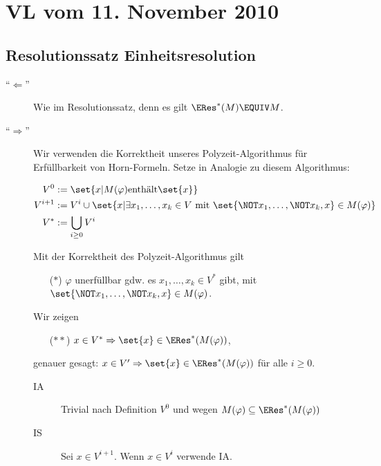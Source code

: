 \section{VL vom 11. November 2010}

\subsection{Resolutionssatz Einheitsresolution}

\begin{description}
  \item[\enquote{$\Leftarrow$}]
  Wie im Resolutionssatz, denn es gilt $\ERes^*(M)\EQUIV M$.
  
  \item[\enquote{$\Rightarrow$}]
  Wir verwenden die Korrektheit unseres Polyzeit-Algorithmus für Erfüllbarkeit
  von Horn-Formeln. Setze in Analogie zu diesem Algorithmus:
  
  \begin{align}
    V^0     &:= \set{x| M(\varphi) \text{enthält} \set{x}} \\
    V^{i+1} &:= V^i \cup \set{x| \exists x_1,\dots,x_k \in V\ \text{mit}\ \set{\NOT x_1,\dots,\NOT x_k,x} \in M(\varphi)} \\
    V^*     &:= \bigcup_{i\geq 0} V^i \\
  \end{align}
  
  Mit der Korrektheit des Polyzeit-Algorithmus gilt
  \begin{itemize}
    \item[($*$)] $\varphi$ unerfüllbar gdw. es $x_1,\dots,x_k \in V^*$ gibt, mit
    $\set{\NOT x_1,\dots,\NOT x_k,x}\in M(\varphi)$.
  \end{itemize}
  
  Wir zeigen
  \begin{itemize}
    \item[($**$)] $x\in V^* \Rightarrow \set{x} \in \ERes^*(M(\varphi))$,
  \end{itemize}
  genauer gesagt: $x\in V' \Rightarrow \set{x} \in \ERes^*(M(\varphi))$ für
  alle $i\geq 0$.

  
  \begin{description}
    \item[IA]
    Trivial nach Definition $V^0$ und wegen $M(\varphi) \subseteq \ERes^*(M(\varphi))$
    
    \item[IS]
    Sei $x \in V^{i+1}$. Wenn $x\in V^i$ verwende IA.
    

\end{description}
\end{description}
